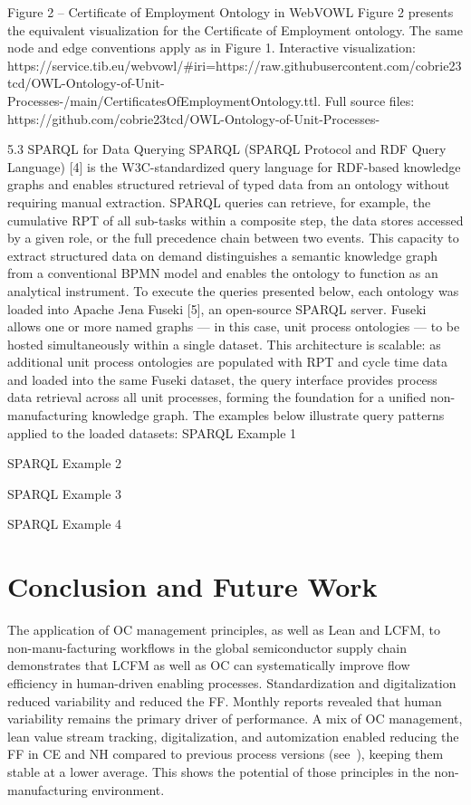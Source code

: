 \documentclass[preprint,12pt,authoryear]{elsarticle}
\begin{document}
 
Figure 2 – Certificate of Employment Ontology in WebVOWL
Figure 2 presents the equivalent visualization for the Certificate of Employment ontology. The same node and edge conventions apply as in Figure 1. Interactive visualization: https://service.tib.eu/webvowl/#iri=https://raw.githubusercontent.com/cobrie23tcd/OWL-Ontology-of-Unit-Processes-/main/CertificatesOfEmploymentOntology.ttl. 
Full source files: https://github.com/cobrie23tcd/OWL-Ontology-of-Unit-Processes-

5.3 SPARQL for Data Querying
SPARQL (SPARQL Protocol and RDF Query Language) [4] is the W3C-standardized query language for RDF-based knowledge graphs and enables structured retrieval of typed data from an ontology without requiring manual extraction. SPARQL queries can retrieve, for example, the cumulative RPT of all sub-tasks within a composite step, the data stores accessed by a given role, or the full precedence chain between two events. This capacity to extract structured data on demand distinguishes a semantic knowledge graph from a conventional BPMN model and enables the ontology to function as an analytical instrument.
To execute the queries presented below, each ontology was loaded into Apache Jena Fuseki [5], an open-source SPARQL server. Fuseki allows one or more named graphs — in this case, unit process ontologies — to be hosted simultaneously within a single dataset. 
This architecture is scalable: as additional unit process ontologies are populated with RPT and cycle time data and loaded into the same Fuseki dataset, the query interface provides process data retrieval across all unit processes, forming the foundation for a unified non-manufacturing knowledge graph. 
The examples below illustrate query patterns applied to the loaded datasets:
SPARQL Example 1

SPARQL Example 2

SPARQL Example 3

SPARQL Example 4



\section{Conclusion and Future Work}\label{sec:Conclusion and Future Work}

The application of OC management principles, as well as Lean and LCFM, to non-manu-facturing workflows in the global semiconductor supply chain demonstrates that LCFM as well as OC can systematically improve flow efficiency in human-driven enabling processes. Standardization and digitalization reduced variability and reduced the FF\@. Monthly reports revealed that human variability remains the primary driver of performance. A mix of OC management, lean value stream tracking, digitalization, and automization enabled reducing the FF in CE and NH compared to previous process versions (see~\cite{LauterEhmReiner2025}), keeping them stable at a lower average. This shows the potential of those principles in the non-manufacturing environment.
\end{document}
